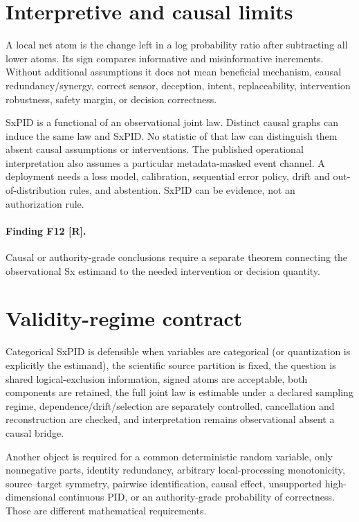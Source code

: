 \documentclass[11pt]{article}
\newcommand{\evidence}[1]{\textbf{[#1]}}
\begin{document}
\section{Interpretive and causal limits}

A local net atom is the change left in a log probability ratio after subtracting all lower atoms.  Its sign compares
informative and misinformative increments.  Without additional assumptions it
does not mean beneficial mechanism, causal redundancy/synergy, correct sensor,
deception, intent, replaceability, intervention robustness, safety margin, or
decision correctness.

SxPID is a functional of an observational joint law.  Distinct causal graphs
can induce the same law and SxPID\@.  No statistic of that law can distinguish
them absent causal assumptions or interventions.  The published operational
interpretation also assumes a particular metadata-masked event channel.  A
deployment needs a loss model, calibration, sequential error policy, drift and
out-of-distribution rules, and abstention.  SxPID can be evidence, not an
authorization rule.

\paragraph{Finding F12 \evidence{R}.}
Causal or authority-grade conclusions require a separate theorem connecting
the observational Sx estimand to the needed intervention or decision quantity.

\section{Validity-regime contract}

Categorical SxPID is defensible when variables are categorical (or quantization
is explicitly the estimand), the scientific source partition is fixed, the
question is shared logical-exclusion information, signed atoms are acceptable,
both components are retained, the full joint law is estimable under a declared
sampling regime, dependence/drift/selection are separately controlled,
cancellation and reconstruction are checked, and interpretation remains
observational absent a causal bridge.

Another object is required for a common deterministic random variable, only
nonnegative parts, identity redundancy, arbitrary local-processing
monotonicity, source--target symmetry, pairwise identification, causal effect,
unsupported high-dimensional continuous PID, or an authority-grade probability
of correctness.  Those are different mathematical requirements.
\end{document}
